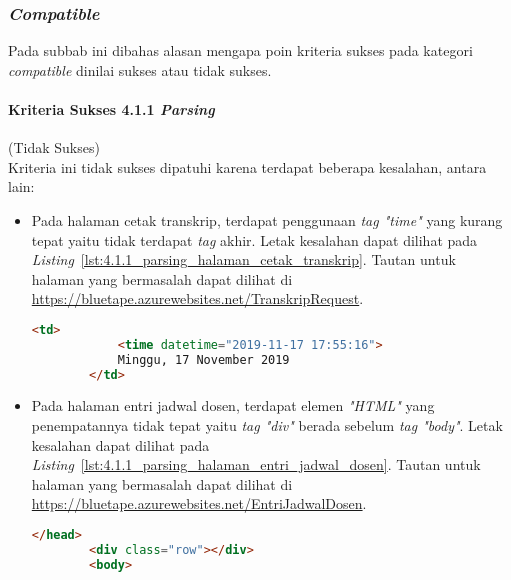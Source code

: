 \subsubsection{\textit{Compatible}}
\label{subsubsec:kepatuhan_bluetape_compatible}
Pada subbab ini dibahas alasan mengapa poin kriteria sukses pada kategori \textit{compatible} dinilai sukses atau tidak sukses.

\paragraph{Kriteria Sukses 4.1.1 \textit{Parsing}}
\label{par:kepatuhan_bluetape_kriteria_sukses_4.1.1}
(Tidak Sukses)\\

Kriteria ini tidak sukses dipatuhi karena terdapat beberapa kesalahan, antara lain:

\begin{itemize}
    \item Pada halaman cetak transkrip, terdapat penggunaan \textit{tag "time"} yang kurang tepat yaitu tidak terdapat \textit{tag} akhir. Letak kesalahan dapat dilihat pada \mbox{\textit{Listing} \ref{lst:4.1.1_parsing_halaman_cetak_transkrip}}. Tautan untuk halaman yang bermasalah dapat dilihat di \url{https://bluetape.azurewebsites.net/TranskripRequest}.
    \begin{lstlisting}[frame=single, label={lst:4.1.1_parsing_halaman_cetak_transkrip}, language=HTML, caption=Pelanggaran Kriteria Sukses 4.1.1 pada Halaman Cetak Transkrip]
        <td>
            <time datetime="2019-11-17 17:55:16">
            Minggu, 17 November 2019
        </td>
    \end{lstlisting}

    \item Pada halaman entri jadwal dosen, terdapat elemen \textit{"HTML"} yang penempatannya tidak tepat yaitu \textit{tag "div"} berada sebelum \textit{tag "body"}. Letak kesalahan dapat dilihat pada \mbox{\textit{Listing} \ref{lst:4.1.1_parsing_halaman_entri_jadwal_dosen}}. Tautan untuk halaman yang bermasalah dapat dilihat di \url{https://bluetape.azurewebsites.net/EntriJadwalDosen}.
    \begin{lstlisting}[frame=single, label={lst:4.1.1_parsing_halaman_entri_jadwal_dosen}, language=HTML, caption=Pelanggaran Kriteria Sukses 4.1.1 pada Halaman Entri Jadwal Dosen]
        </head>
        <div class="row"></div>        
        <body>
    \end{lstlisting}
\end{itemize}

